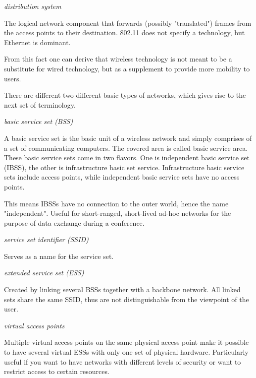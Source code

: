 \documentclass{article}
\begin{document}
	\bigskip
	
	\emph{distribution system}
	
	The logical network component that forwards (possibly "translated") frames from the access points to their destination. 802.11 does not specify a technology, but Ethernet is dominant. 
	
	From this fact one can derive that wireless technology is not meant to be a substitute for wired technology, but as a supplement to provide more mobility to users.
	
	\bigskip
	
	There are different two different basic types of networks, which gives rise to the next set of terminology.
	
	\bigskip
	
	\emph{basic service set (BSS)} 
	
	A basic service set is the basic unit of a wireless network and simply comprises of a set of communicating computers. The covered area is called basic service area. These basic service sets come in two flavors. One is independent basic service set (IBSS), the other is infrastructure basic set service. Infrastructure basic service sets include access points, while independent basic service sets have no access points.
	
	\medskip 
	
	This means IBSSs have no connection to the outer world, hence the name "independent". Useful for short-ranged, short-lived ad-hoc networks for the purpose of data exchange during a conference. 
	
	\bigskip
	
	\emph{service set identifier (SSID)}
	
	Serves as a name for the service set.
	
	\bigskip
	
	\emph{extended service set (ESS)}
	
	Created by linking several BSSs together with a backbone network. All linked sets share the same SSID, thus are not distinguishable from the viewpoint of the user.
	
	\bigskip
	
	\emph{virtual access points}

	Multiple virtual access points on the same physical access point make it possible to have several virtual ESSs with only one set of physical hardware. Particularly useful if you want to have networks with different levels of security or want to restrict access to certain resources.
	
\end{document}
